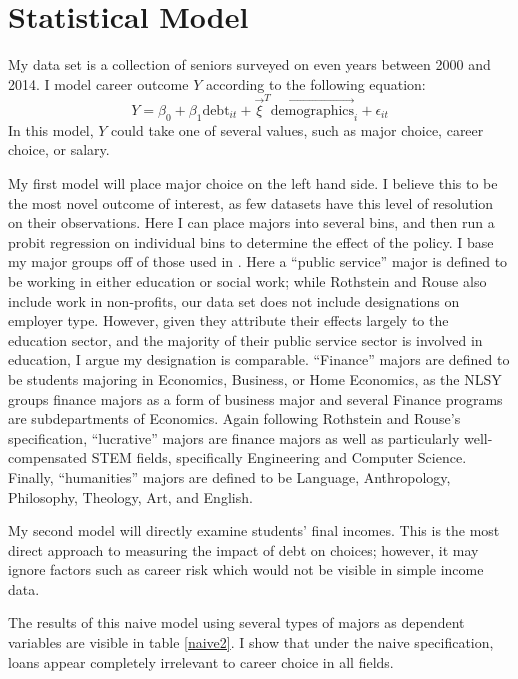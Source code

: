 \documentclass[12pt]{article}
\begin{document}
	\section{Statistical Model}
	
	My data set is a collection of seniors surveyed on even years between 2000 and 2014. I model career outcome $Y$ according to the following equation: 
	\begin{equation}
	Y = \beta_0 + \beta_1 \mbox{debt}_{it} + \vec{\xi}^T \vec{\mbox{demographics}}_i + \epsilon_{it} \label{naiveeq}
	\end{equation} 
	In this model, $Y$ could take one of several values, such as major choice, career choice, or salary. 
	
	My first model will place major choice on the left hand side. I believe this to be the most novel outcome of interest, as few datasets have this level of resolution on their observations. Here I can place majors into several bins, and then run a probit regression on individual bins to determine the effect of the policy. I base my major groups off of those used in \textcite{rothstein2011}. Here a ``public service'' major is defined to be working in either education or social work; while Rothstein and Rouse also include work in non-profits, our data set does not include designations on employer type. However, given they attribute their effects largely to the education sector, and the majority of their public service sector is involved in education, I argue my designation is comparable. ``Finance'' majors are defined to be students majoring in Economics, Business, or Home Economics, as the NLSY groups finance majors as a form of business major and several Finance programs are subdepartments of Economics. Again following Rothstein and Rouse's specification, ``lucrative'' majors are finance majors as well as particularly well-compensated STEM fields, specifically Engineering and Computer Science. Finally, ``humanities'' majors are defined to be Language, Anthropology, Philosophy, Theology, Art, and English.
	
	My second model will directly examine students' final incomes. This is the most direct approach to measuring the impact of debt on choices; however, it may ignore factors such as career risk which would not be visible in simple income data.
	
	The results of this naive model using several types of majors as dependent variables are visible in table \ref{naive2}. I show that under the naive specification, loans appear completely irrelevant to career choice in all fields.
	
\end{document}
